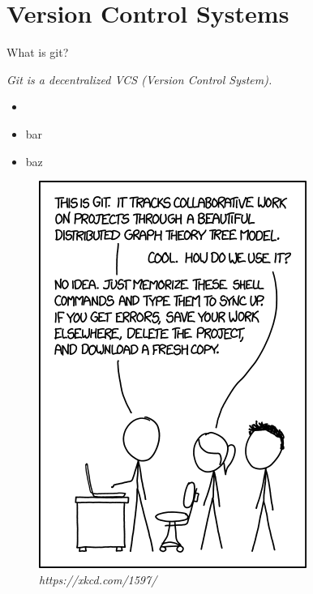 \section{Version Control Systems}

\begin{frame}[fragile]{What is git?}

    \emph{Git is a decentralized VCS (Version Control System).}

    \begin{minipage}{0.49\textwidth}
        \begin{itemize}
            \item 
            \item bar
            \item baz
        \end{itemize}
    \end{minipage}
    \begin{minipage}{0.49\textwidth}
        \begin{figure}
            \centering
            \includegraphics[height=0.6\textheight]{img/xkcdgit.png}
            \caption{\textit{https://xkcd.com/1597/}}
        \end{figure}
    \end{minipage}

\end{frame}

